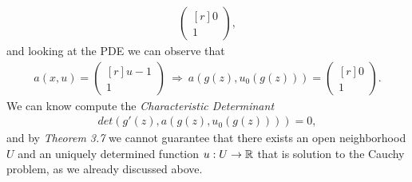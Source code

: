 \begin{questions}
\begin{solution}
\begin{align*}
\begin{pmatrix*}[r]
0\\
1
\end{pmatrix*},
\end{align*}
and looking at the PDE we can observe that
\begin{align*}
a(x,u)=\begin{pmatrix*}[r]
u-1\\
1~~~
\end{pmatrix*}~\Rightarrow~a(g(z),u_0(g(z)))=\begin{pmatrix*}[r]
0\\
1
\end{pmatrix*}.
\end{align*}
We can know compute the \textit{Characteristic Determinant}
\begin{align*}
det(g'(z),a(g(z),u_0(g(z))))=0,
\end{align*}
and by \textsl{Theorem 3.7} we cannot guarantee that there exists an open neighborhood $U$ and an uniquely determined function $u:U\rightarrow\mathbb{R}$ that is solution to the Cauchy problem, as we already discussed above.

\end{solution}

\end{questions}